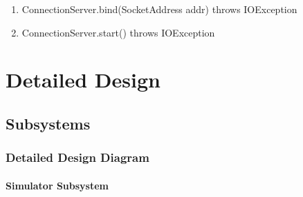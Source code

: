\documentclass{article}
\begin{document}
\begin{enumerate}
  \item ConnectionServer.bind(SocketAddress addr) throws IOException
	\item ConnectionServer.start() throws IOException
\end{enumerate}

\break

\section{Detailed Design} %

\subsection{Subsystems} %

\subsubsection{Detailed Design Diagram} %

\paragraph{Simulator Subsystem} 
\end{document}
